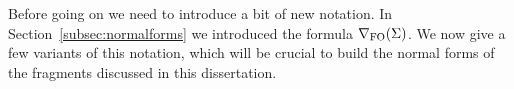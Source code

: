 


Before going on we need to introduce a bit of new notation. In Section~\ref{subsec:normalforms} we introduced the formula $\nabla_{\mathrm{FO}}(\Sigma)$. We now give a few variants of this notation, which will be crucial to build the normal forms of the fragments discussed in this dissertation.

